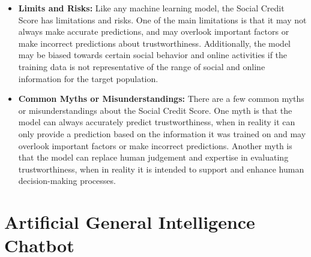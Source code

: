 \begin{itemize}
\begin{enumerate}
        \end{enumerate}
    \item \textbf{Limits and Risks:} Like any machine learning model, the Social Credit Score has limitations and risks. One of the main limitations is that it may not always make accurate predictions, and may overlook important factors or make incorrect predictions about trustworthiness. Additionally, the model may be biased towards certain social behavior and online activities if the training data is not representative of the range of social and online information for the target population.
    \item \textbf{Common Myths or Misunderstandings:} There are a few common myths or misunderstandings about the Social Credit Score. One myth is that the model can always accurately predict trustworthiness, when in reality it can only provide a prediction based on the information it was trained on and may overlook important factors or make incorrect predictions. Another myth is that the model can replace human judgement and expertise in evaluating trustworthiness, when in reality it is intended to support and enhance human decision-making processes.
\end{itemize}

\section{Artificial General Intelligence Chatbot}

